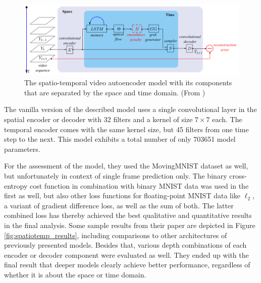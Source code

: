 \begin{figure}[htb]
	\centering
	\includegraphics[width=0.9\linewidth]{figures/related/spat_temp_video.png} 
	\caption[Spatio-Temporal Video Autoencoder Model]{The spatio-temporal video autoencoder model with its components that are separated by the space and time domain. (From \parencite{spat_temp_video_autoenc})} \label{fig:spatiotemp_model}
\end{figure}

The vanilla version of the described model uses a single convolutional layer in the spatial encoder or decoder with \num{32} filters and a kernel of size $7 \times 7$ each. The temporal encoder comes with the same kernel size, but \num{45} filters from one time step to the next. This model exhibits a total number of only \num{703651} model parameters. 

For the assessment of the model, they used the MovingMNIST dataset as well, but unfortunately in context of single frame prediction only. The binary cross-entropy cost function in combination with binary MNIST data was used in the first as well, but also other loss functions for floating-point MNIST data like $\ell_2$, a variant of gradient difference loss, as well as the sum of both. The latter combined loss has thereby achieved the best qualitative and quantitative results in the final analysis. Some sample results from their paper are depicted in Figure \ref{fig:spatiotemp_results}, including comparisons to other architectures of previously presented models. Besides that, various depth combinations of each encoder or decoder component were evaluated as well. They ended up with the final result that deeper models clearly achieve better performance, regardless of whether it is about the space or time domain.


